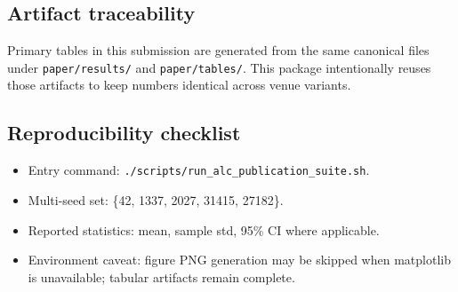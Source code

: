 \subsection{Artifact traceability}
Primary tables in this submission are generated from the same canonical files under \texttt{paper/results/} and \texttt{paper/tables/}. This package intentionally reuses those artifacts to keep numbers identical across venue variants.

\subsection{Reproducibility checklist}
\begin{itemize}
  \item Entry command: \texttt{./scripts/run\_alc\_publication\_suite.sh}.
  \item Multi-seed set: \{42, 1337, 2027, 31415, 27182\}.
  \item Reported statistics: mean, sample std, 95\% CI where applicable.
  \item Environment caveat: figure PNG generation may be skipped when matplotlib is unavailable; tabular artifacts remain complete.
\end{itemize}
